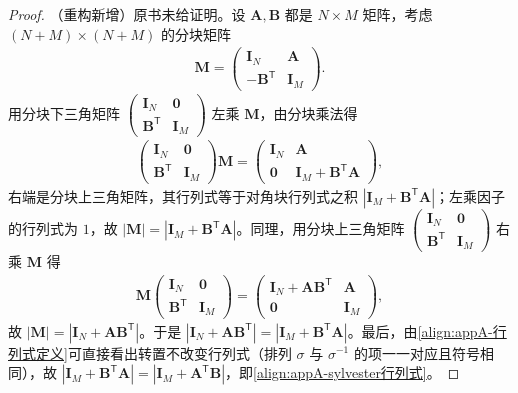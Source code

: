 \documentclass[../main.tex]{subfiles}
\begin{document}
\begin{proof}
（重构新增）原书未给证明。设 $\bm{A},\bm{B}$ 都是 $N\times M$ 矩阵，考虑 $(N+M)\times(N+M)$ 的分块矩阵
\begin{align*}
  \bm{M}=\begin{pmatrix}\bm{I}_N&\bm{A}\\-\bm{B}^{\mathsf{T}}&\bm{I}_M\end{pmatrix}.
\end{align*}
用分块下三角矩阵 $\begin{pmatrix}\bm{I}_N&\bm{0}\\\bm{B}^{\mathsf{T}}&\bm{I}_M\end{pmatrix}$ 左乘 $\bm{M}$，由分块乘法得
\begin{align*}
  \begin{pmatrix}\bm{I}_N&\bm{0}\\\bm{B}^{\mathsf{T}}&\bm{I}_M\end{pmatrix}\bm{M}=\begin{pmatrix}\bm{I}_N&\bm{A}\\\bm{0}&\bm{I}_M+\bm{B}^{\mathsf{T}}\bm{A}\end{pmatrix},
\end{align*}
右端是分块上三角矩阵，其行列式等于对角块行列式之积 $|\bm{I}_M+\bm{B}^{\mathsf{T}}\bm{A}|$；左乘因子的行列式为 $1$，故 $|\bm{M}|=|\bm{I}_M+\bm{B}^{\mathsf{T}}\bm{A}|$。同理，用分块上三角矩阵 $\begin{pmatrix}\bm{I}_N&\bm{0}\\\bm{B}^{\mathsf{T}}&\bm{I}_M\end{pmatrix}$ 右乘 $\bm{M}$ 得
\begin{align*}
  \bm{M}\begin{pmatrix}\bm{I}_N&\bm{0}\\\bm{B}^{\mathsf{T}}&\bm{I}_M\end{pmatrix}=\begin{pmatrix}\bm{I}_N+\bm{A}\bm{B}^{\mathsf{T}}&\bm{A}\\\bm{0}&\bm{I}_M\end{pmatrix},
\end{align*}
故 $|\bm{M}|=|\bm{I}_N+\bm{A}\bm{B}^{\mathsf{T}}|$。于是 $|\bm{I}_N+\bm{A}\bm{B}^{\mathsf{T}}|=|\bm{I}_M+\bm{B}^{\mathsf{T}}\bm{A}|$。最后，由\eqref{align:appA-行列式定义}可直接看出转置不改变行列式（排列 $\sigma$ 与 $\sigma^{-1}$ 的项一一对应且符号相同），故 $|\bm{I}_M+\bm{B}^{\mathsf{T}}\bm{A}|=|\bm{I}_M+\bm{A}^{\mathsf{T}}\bm{B}|$，即\eqref{align:appA-sylvester行列式}。
\end{proof}
\end{document}
